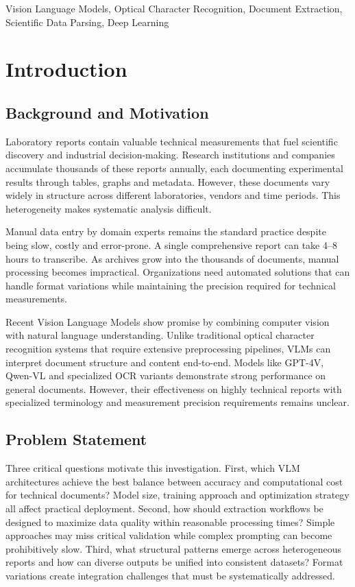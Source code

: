 \documentclass[conference]{IEEEtran}
\begin{document}
\begin{IEEEkeywords}
Vision Language Models, Optical Character Recognition, Document Extraction, Scientific Data Parsing, Deep Learning
\end{IEEEkeywords}

\section{Introduction}

\subsection{Background and Motivation}

Laboratory reports contain valuable technical measurements that fuel scientific discovery and industrial decision-making. Research institutions and companies accumulate thousands of these reports annually, each documenting experimental results through tables, graphs and metadata. However, these documents vary widely in structure across different laboratories, vendors and time periods. This heterogeneity makes systematic analysis difficult.

Manual data entry by domain experts remains the standard practice despite being slow, costly and error-prone. A single comprehensive report can take 4--8 hours to transcribe. As archives grow into the thousands of documents, manual processing becomes impractical. Organizations need automated solutions that can handle format variations while maintaining the precision required for technical measurements.

Recent Vision Language Models show promise by combining computer vision with natural language understanding. Unlike traditional optical character recognition systems that require extensive preprocessing pipelines, VLMs can interpret document structure and content end-to-end. Models like GPT-4V, Qwen-VL and specialized OCR variants demonstrate strong performance on general documents. However, their effectiveness on highly technical reports with specialized terminology and measurement precision requirements remains unclear.

\subsection{Problem Statement}

Three critical questions motivate this investigation. First, which VLM architectures achieve the best balance between accuracy and computational cost for technical documents? Model size, training approach and optimization strategy all affect practical deployment. Second, how should extraction workflows be designed to maximize data quality within reasonable processing times? Simple approaches may miss critical validation while complex prompting can become prohibitively slow. Third, what structural patterns emerge across heterogeneous reports and how can diverse outputs be unified into consistent datasets? Format variations create integration challenges that must be systematically addressed.
\end{document}
